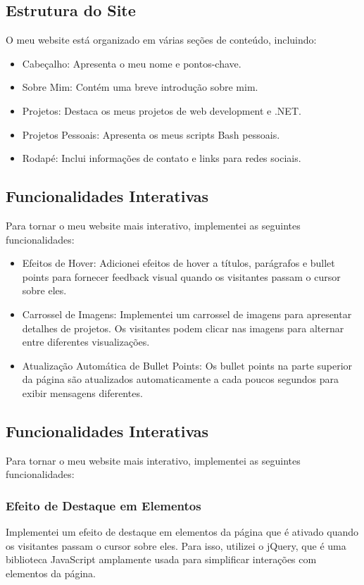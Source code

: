 \documentclass{article}
\begin{document}
\subsection{Estrutura do Site}
O meu website está organizado em várias seções de conteúdo, incluindo:

\begin{itemize}
    \item Cabeçalho: Apresenta o meu nome e pontos-chave.
    \item Sobre Mim: Contém uma breve introdução sobre mim.
    \item Projetos: Destaca os meus projetos de web development e .NET.
    \item Projetos Pessoais: Apresenta os meus scripts Bash pessoais.
    \item Rodapé: Inclui informações de contato e links para redes sociais.
\end{itemize}

\subsection{Funcionalidades Interativas}
Para tornar o meu website mais interativo, implementei as seguintes funcionalidades:

\begin{itemize}
    \item Efeitos de Hover: Adicionei efeitos de hover a títulos, parágrafos e bullet points para fornecer feedback visual quando os visitantes passam o cursor sobre eles.
    \item Carrossel de Imagens: Implementei um carrossel de imagens para apresentar detalhes de projetos. Os visitantes podem clicar nas imagens para alternar entre diferentes visualizações.
    \item Atualização Automática de Bullet Points: Os bullet points na parte superior da página são atualizados automaticamente a cada poucos segundos para exibir mensagens diferentes.
\end{itemize}

\subsection{Funcionalidades Interativas}
Para tornar o meu website mais interativo, implementei as seguintes funcionalidades:

\subsubsection{Efeito de Destaque em Elementos}
Implementei um efeito de destaque em elementos da página que é ativado quando os visitantes passam o cursor sobre eles. Para isso, utilizei o jQuery, que é uma biblioteca JavaScript amplamente usada para simplificar interações com elementos da página.
\end{document}
